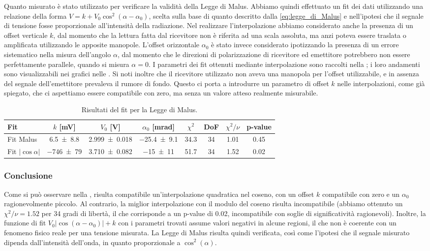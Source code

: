 \documentclass[a4paper]{article}
\begin{document}
Quanto misurato è stato utilizzato per verificare la validità della Legge di Malus. 
Abbiamo quindi effettuato un fit dei dati utilizzando una relazione della forma $V = k+V_0\cos^2(\alpha - \alpha_0)$, 
scelta sulla base di quanto descritto dalla \cref{eq:legge_di_Malus} e nell'ipotesi che il segnale di tensione fosse proporzionale all'intensità della radiazione. 
Nel realizzare l'interpolazione abbiamo considerato anche la presenza di un offset verticale $k$, dal momento che la lettura fatta dal ricevitore non è riferita ad una scala assoluta, 
ma anzi poteva essere traslata o amplificata utilizzando le apposite manopole. 
L'offset orizzontale $\alpha_0$ è stato invece considerato ipotizzando la presenza di un errore sistematico nella misura dell'angolo $\alpha$,
dal momento che le direzioni di polarizzazione di ricevitore ed emettitore potrebbero non essere perfettamente parallele, quando si misura $\alpha = 0$.
I parametri dei fit ottenuti mediante interpolazione sono raccolti nella ; i loro andamenti sono visualizzabili nei grafici nelle . Si noti inoltre che il ricevitore utilizzato non aveva una manopola per l'offset utilizzabile, e in assenza del segnale dell'emettitore prevaleva il rumore di fondo. Questo ci porta a introdurre un parametro di offset $k$ nelle interpolazioni, come già spiegato, che ci aspettiamo essere compatibile con zero, ma senza un valore atteso realmente misurabile.
\begin{table}[htbp]
\centering
\caption{Risultati del fit per la Legge di Malus.}
\label{tab:fit_Malus}
\begin{tabular}{|l|ccccccc|}
\hline
Fit & $k$ [\si{\milli\volt}]& $V_0$ [\si{\volt}]& $\alpha_0$ [\si{\milli\radian}]& $\chi^2$ & DoF & $\chi^2/\nu$ & p-value \\\hline\hline
Fit Malus & \SI{6.5 \pm 8.8}{} & \SI{2.999 \pm 0.018}{} & \SI{-25.4 \pm 9.1}{} & 34.3 & 34 & 1.01 & 0.45 \\\hline
Fit $|\cos\alpha|$ & \SI{-746 \pm 79}{} & \SI{3.710 \pm 0.082}{} & \SI{-15 \pm 11}{} & 51.7 & 34 & 1.52 & 0.02 \\\hline
\end{tabular}
\end{table}

\subsubsection{Conclusione}
Come si può osservare nella , risulta compatibile un'interpolazione quadratica nel coseno, con un offset $k$ compatibile con zero e un $\alpha_0$ ragionevolmente piccolo. Al contrario, la miglior interpolazione con il modulo del coseno risulta incompatibile (abbiamo ottenuto un $\chi^2/\nu = \num{1.52}$ per \num{34} gradi di libertà, il che corrisponde a un p-value di 0.02, incompatibile con soglie di significatività ragionevoli). Inoltre, la funzione di fit $V_0 |\cos(\alpha - \alpha_0)| + k$ con i parametri trovati assume valori negativi in alcune regioni, il che non è coerente con un fenomeno fisico reale per una tensione misurata.
La Legge di Malus risulta quindi verificata, così come l'ipotesi che il segnale misurato dipenda dall'intensità dell'onda, in quanto proporzionale a $\cos^2(\alpha)$.
\end{document}
